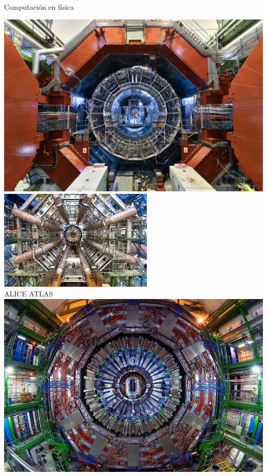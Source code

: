 \documentclass[10pt,xcolor={dvipsnames}]{beamer}
\begin{document}
\begin{frame}{Computación en física}
\begin{center}
\includegraphics[scale=0.13]{Figures/ALICE}
\includegraphics[scale=0.43]{Figures/Atlas} \\
ALICE \hspace{4cm} ATLAS \\ \vspace{0.5cm}
\includegraphics[scale=0.13]{Figures/CMS}

\end{center}
\end{frame}
\end{document}
